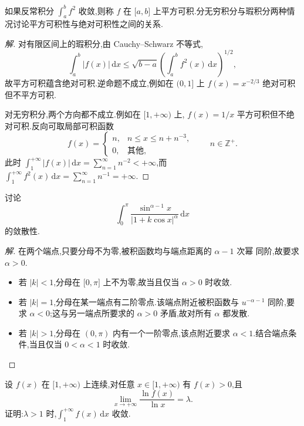 \documentclass[../../数学分析培优讲义(答案版).tex]{subfiles}
\begin{document}
\begin{example}
如果反常积分 $\displaystyle\int_a^bf^2$ 收敛,则称 $f$ 在 $\lbrack a,b\rbrack$ 上平方可积.分无穷积分与瑕积分两种情况讨论平方可积性与绝对可积性之间的关系.
\end{example}

\begin{proof}[解]
对有限区间上的瑕积分,由 Cauchy--Schwarz 不等式,
\[
    \int_a^b|f(x)|\,\mathrm{d}x
    \leq\sqrt{b-a}\left(\int_a^bf^2(x)\,\mathrm{d}x\right)^{1/2},
\]
故平方可积蕴含绝对可积.逆命题不成立,例如在 $(0,1\rbrack$ 上
$f(x)=x^{-2/3}$ 绝对可积但不平方可积.

对无穷积分,两个方向都不成立.例如在 $\lbrack1,+\infty)$ 上,
$f(x)=1/x$ 平方可积但不绝对可积.反向可取局部可积函数
\[
    f(x)=
    \begin{cases}
        n,&n\leq x\leq n+n^{-3},\\
        0,&\text{其他},
    \end{cases}
    \qquad n\in\mathbb{Z}^+.
\]
此时 $\displaystyle\int_1^{+\infty}|f(x)|\,\mathrm{d}x
=\sum\limits_{n=1}^{\infty}n^{-2}<+\infty$,而
$\displaystyle\int_1^{+\infty}f^2(x)\,\mathrm{d}x
=\sum\limits_{n=1}^{\infty}n^{-1}=+\infty$.
\end{proof}

\begin{example}
讨论
\[
\int_0^\pi\dfrac{\sin^{\alpha-1}x}{|1+k\cos x|^\alpha}\,\mathrm{d}x
\]
的敛散性.
\end{example}

\begin{proof}[解]
在两个端点,只要分母不为零,被积函数均与端点距离的 $\alpha-1$ 次幂
同阶,故要求 $\alpha>0$.
\begin{itemize}
    \item 若 $|k|<1$,分母在 $\lbrack0,\pi\rbrack$ 上不为零,故当且仅当
    $\alpha>0$ 时收敛.
    \item 若 $|k|=1$,分母在某一端点有二阶零点.该端点附近被积函数与
    $u^{-\alpha-1}$ 同阶,要求 $\alpha<0$;这与另一端点所要求的
    $\alpha>0$ 矛盾,故对所有 $\alpha$ 都发散.
    \item 若 $|k|>1$,分母在 $(0,\pi)$ 内有一个一阶零点,该点附近要求
    $\alpha<1$.结合端点条件,当且仅当 $0<\alpha<1$ 时收敛.
\end{itemize}
\end{proof}

\begin{example}
设 $f(x)$ 在 $\lbrack 1,+\infty)$ 上连续,对任意 $x\in\lbrack 1,+\infty)$ 有 $f(x)>0$,且
\[
    \lim\limits_{x\to+\infty}\dfrac{\ln f(x)}{\ln x}=\lambda.
\]
证明:$\lambda>1$ 时,$\displaystyle\int_1^{+\infty}f(x)\,\mathrm{d}x$ 收敛.
\end{example}
\end{document}
